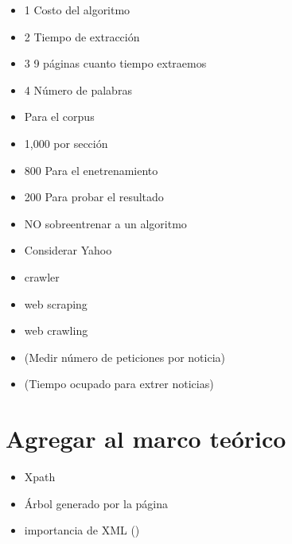 \begin{itemize}

	\item 1 Costo del algoritmo
	\item 2 Tiempo de extracción
	\item 3 9 páginas cuanto tiempo extraemos
	\item 4 Número de palabras



	\item Para el corpus 
	\item 	1,000 por sección
	\item 		800 Para el enetrenamiento
	\item 		200 Para probar el resultado

	\item NO sobreentrenar a un algoritmo

	\item Considerar Yahoo



	\item crawler
	\item web scraping
	\item web crawling

	\item (Medir número de peticiones por noticia)
	\item (Tiempo ocupado para extrer noticias)

\end{itemize}

\section{Agregar al marco teórico}

	\begin{itemize}
		\item Xpath
		\item Árbol generado por la página
		\item importancia de XML ()
	\end{itemize}	

